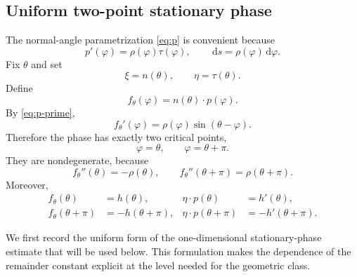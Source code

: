 \documentclass[12pt]{article}
\numberwithin{equation}{section}
\numberwithin{equation}{section}
\newcommand{\dd}{\,\mathrm{d}}
\begin{document}
\subsection{Uniform two-point stationary phase}

The normal-angle parametrization \eqref{eq:p} is convenient because
\begin{equation}\label{eq:p-prime}
p'(\varphi)=\rho(\varphi)\tau(\varphi),
\qquad
\dd s=\rho(\varphi)\dd\varphi.
\end{equation}
Fix $\theta$ and set
\[
\xi=n(\theta),\qquad \eta=\tau(\theta).
\]
Define
\begin{equation*}\label{eq:phase}
f_\theta(\varphi)=n(\theta)\cdot p(\varphi).
\end{equation*}
By \eqref{eq:p-prime},
\begin{equation}\label{eq:phase-derivative}
f_\theta'(\varphi)
=\rho(\varphi)\sin(\theta-\varphi).
\end{equation}
Therefore the phase has exactly two critical points,
\[
\varphi=\theta,\qquad \varphi=\theta+\pi.
\]
They are nondegenerate, because
\begin{equation}\label{eq:phase-hessian}
f_\theta''(\theta)=-\rho(\theta),\qquad
f_\theta''(\theta+\pi)=\rho(\theta+\pi).
\end{equation}
Moreover,
\begin{equation}\label{eq:stationary-values}
\begin{aligned}
f_\theta(\theta)&=h(\theta),&
\eta\cdot p(\theta)&=h'(\theta),\\
f_\theta(\theta+\pi)&=-h(\theta+\pi),&
\eta\cdot p(\theta+\pi)&=-h'(\theta+\pi).
\end{aligned}
\end{equation}

We first record the uniform form of the one-dimensional stationary-phase
estimate that will be used below. This formulation makes the dependence of
the remainder constant explicit at the level needed for the geometric
class.
\end{document}
